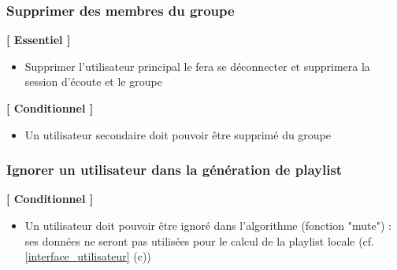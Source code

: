 \documentclass{article}
\begin{document}
		\subsubsection{Supprimer des membres du groupe}
		\textbf{[ Essentiel ]}
		\begin{itemize}
			\item Supprimer l'utilisateur principal le fera se déconnecter et supprimera la session d'écoute et le groupe
		\end{itemize}
		\textbf{[ Conditionnel ]}
		\begin{itemize}
			\item Un utilisateur secondaire doit pouvoir être supprimé du groupe
		\end{itemize}
						            
		\subsubsection{Ignorer un utilisateur dans la génération de playlist}
		\textbf{[ Conditionnel ]}
		\begin{itemize}
			\item Un utilisateur doit pouvoir être ignoré dans l'algorithme (fonction "mute") : ses données ne seront pas utilisées pour le calcul de la playlist locale (cf. \ref{interface_utilisateur} (c))
		\end{itemize}
\end{document}
